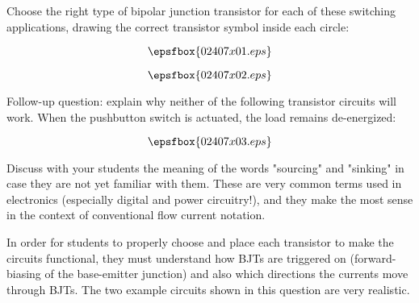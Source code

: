 

Choose the right type of bipolar junction transistor for each of these switching applications, drawing the correct transistor symbol inside each circle:

$$\epsfbox{02407x01.eps}$$







$$\epsfbox{02407x02.eps}$$

\vskip 10pt

Follow-up question: explain why neither of the following transistor circuits will work.  When the pushbutton switch is actuated, the load remains de-energized:

$$\epsfbox{02407x03.eps}$$







Discuss with your students the meaning of the words "sourcing" and "sinking" in case they are not yet familiar with them.  These are very common terms used in electronics (especially digital and power circuitry!), and they make the most sense in the context of conventional flow current notation.

In order for students to properly choose and place each transistor to make the circuits functional, they must understand how BJTs are triggered on (forward-biasing of the base-emitter junction) and also which directions the currents move through BJTs.  The two example circuits shown in this question are very realistic.




